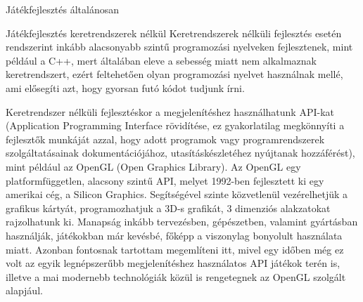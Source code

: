 \begin{MyChapter}{Játékfejlesztés általánosan}
	\begin{MySection}{Játékfejlesztés keretrendszerek nélkül}
		Keretrendszerek nélküli fejlesztés esetén rendszerint inkább alacsonyabb szintű programozási nyelveken fejlesztenek, mint például a C++, mert általában eleve a sebesség miatt nem alkalmaznak keretrendszert, ezért feltehetően olyan programozási nyelvet használnak mellé, ami elősegíti azt, hogy gyorsan futó kódot tudjunk írni.
		
		Keretrendszer nélküli fejlesztéskor a megjelenítéshez használhatunk API-kat (Application Programming Interface rövidítése, ez gyakorlatilag megkönnyíti a fejlesztők munkáját azzal, hogy adott programok vagy programrendszerek szolgáltatásainak dokumentációjához, utasításkészletéhez nyújtanak hozzáférést), mint például az OpenGL (Open Graphics Library). Az OpenGL egy platformfüggetlen, alacsony szintű API, melyet 1992-ben fejlesztett ki egy amerikai cég, a Silicon Graphics. Segítségével szinte közvetlenül vezérelhetjük a grafikus kártyát, programozhatjuk a 3D-s grafikát, 3 dimenziós alakzatokat rajzolhatunk ki. 
		Manapság inkább tervezésben, gépészetben, valamint gyártásban használják, játékokban már kevésbé, főképp a viszonylag bonyolult használata miatt. Azonban fontosnak tartottam megemlíteni itt, mivel egy időben még ez volt az egyik legnépszerűbb megjelenítéshez használatos API játékok terén is, illetve a mai modernebb technológiák közül is rengetegnek az OpenGL szolgált alapjául.
		

\end{MySection}
\end{MyChapter}
